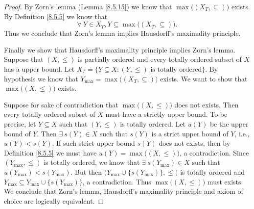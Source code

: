 \begin{proof}
    By Zorn's lemma (Lemma \ref{8.5.15}) we know that \(\max\big((X_T, \subseteq)\big)\) exists.
    By Definition \ref{8.5.5} we know that
    \[
        \forall\ Y \in X_T, Y \subseteq \max\big((X_T, \subseteq)\big).
    \]
    Thus we conclude that Zorn's lemma implies Hausdorff's maximality principle.

    Finally we show that Hausdorff's maximality principle implies Zorn's lemma.
    Suppose that \((X, \leq)\) is partially ordered and every totally ordered subset of \(X\) has a upper bound.
    Let \(X_T = \{Y \subseteq X : (Y, \leq) \text{ is totally ordered}\}\).
    By hypothesis we know that \(Y_{\max} = \max\big((X_T, \subseteq)\big)\) exists.
    We want to show that \(\max\big((X, \leq)\big)\) exists.

    Suppose for sake of contradiction that \(\max\big((X, \leq)\big)\) does not exists.
    Then every totally ordered subset of \(X\) must have a strictly upper bound.
    To be precise, let \(Y \subseteq X\) such that \((Y, \leq)\) is totally ordered.
    Let \(u(Y)\) be the upper bound of \(Y\).
    Then \(\exists\ s(Y) \in X\) such that \(s(Y)\) is a strict upper bound of \(Y\), i.e., \(u(Y) < s(Y)\).
    If such strict upper bound \(s(Y)\) does not exists, then by Definition \ref{8.5.5} we must have \(u(Y) = \max\big((X, \leq)\big)\), a contradiction.
    Since \((Y_{\max}, \leq)\) is totally ordered, we know that \(\exists\ s(Y_{\max}) \in X\) such that \(u(Y_{\max}) < s(Y_{\max})\).
    But then \(\big(Y_{\max} \cup \{s(Y_{\max})\}, \leq\big)\) is totally ordered and \(Y_{\max} \subseteq Y_{\max} \cup \{s(Y_{\max})\}\), a contradiction.
    Thus \(\max\big((X, \leq)\big)\) must exists.
    We conclude that Zorn's lemma, Hausdorff's maximality principle and axiom of choice are logically equivalent.
\end{proof}

